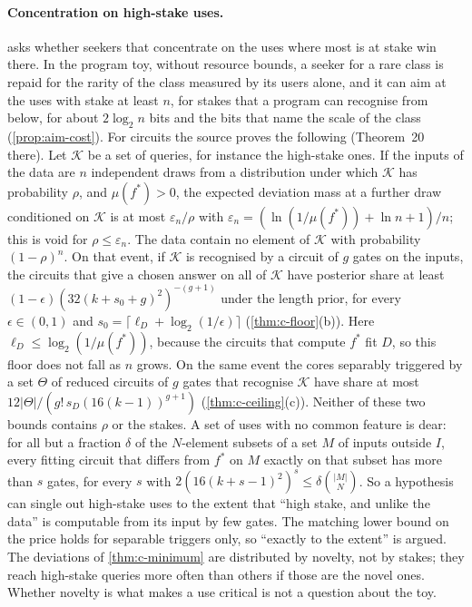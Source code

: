 \paragraph{Concentration on high-stake uses.}  asks whether seekers that concentrate on the
uses where most is at stake win there. In the program toy, without resource bounds, a seeker for a rare class
is repaid for the rarity of the class measured by its users alone, and it can aim at the uses with stake at
least $n$, for stakes that a program can recognise
from below, for about $2\log_2n$ bits and the bits that name the scale of the class
(\cref{prop:aim-cost}). For circuits the source proves the following (Theorem~20 there). Let $\mathcal K$ be a
set of queries, for instance the high-stake ones. If the inputs of the data are $n$ independent draws from a
distribution under which $\mathcal K$ has probability $\rho$, and $\mu(f^*)>0$, the expected deviation mass at
a further draw conditioned on $\mathcal K$ is at most $\varepsilon_n/\rho$ with
$\varepsilon_n=(\ln(1/\mu(f^*))+\ln n+1)/n$; this is void for $\rho\le\varepsilon_n$. The data contain no
element of $\mathcal K$ with probability $(1-\rho)^n$. On that event, if $\mathcal K$ is recognised by a
circuit of $g$ gates on the inputs, the circuits that give a chosen answer on all of $\mathcal K$ have
posterior share at least $(1-\epsilon)(32(k+s_0+g)^2)^{-(g+1)}$ under the length prior, for every
$\epsilon\in(0,1)$ and $s_0=\lceil\ell_D+\log_2(1/\epsilon)\rceil$ (\cref{thm:c-floor}(b)). Here
$\ell_D\le\log_2(1/\mu(f^*))$, because the circuits that compute $f^*$ fit $D$, so this floor does not fall as
$n$ grows. On the same event the cores separably triggered by a set $\Theta$ of reduced circuits of $g$ gates
that recognise $\mathcal K$ have share at most $12|\Theta|/(g!\,s_D(16(k-1))^{g+1})$
(\cref{thm:c-ceiling}(c)). Neither of these two bounds contains $\rho$ or the stakes. A set of uses with no
common feature is dear: for all but a fraction $\delta$ of the $N$-element subsets of a set $M$ of inputs
outside $I$, every fitting circuit that differs from $f^*$ on $M$ exactly on that subset has more than $s$
gates, for every $s$ with $2(16(k+s-1)^2)^s\le\delta\binom{|M|}{N}$. So a hypothesis can single out high-stake
uses to the extent that ``high stake, and unlike the data'' is computable from its input by few gates. The
matching lower bound on the price holds for separable triggers only, so ``exactly to the extent'' is argued.
The deviations of \cref{thm:c-minimum} are distributed by novelty, not by stakes; they reach high-stake
queries more often than others if those are the novel ones. Whether novelty is what makes a use critical is
not a question about the toy.

